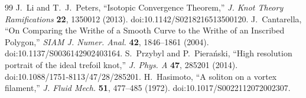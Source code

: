 \begin{thebibliography}{99}
 J.~Li and T.~J.~Peters, ``Isotopic Convergence Theorem,'' \emph{J. Knot Theory Ramifications} \textbf{22}, 1350012 (2013). doi:10.1142/S0218216513500120.
 J.~Cantarella, ``On Comparing the Writhe of a Smooth Curve to the Writhe of an Inscribed Polygon,'' \emph{SIAM J. Numer. Anal.} \textbf{42}, 1846--1861 (2004). doi:10.1137/S0036142902403164.
 S.~Przybyl and P.~Piera\'nski, ``High resolution portrait of the ideal trefoil knot,'' \emph{J. Phys. A} \textbf{47}, 285201 (2014). doi:10.1088/1751-8113/47/28/285201.
 H.~Hasimoto, ``A soliton on a vortex filament,'' \emph{J. Fluid Mech.} \textbf{51}, 477--485 (1972). doi:10.1017/S0022112072002307.
\end{thebibliography}
